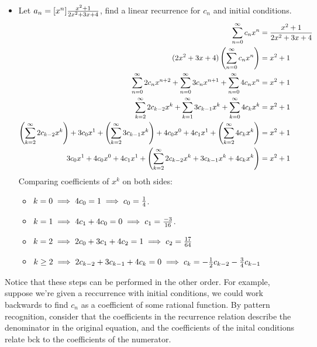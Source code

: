 \documentclass[english, 11pt]{article}
\begin{document}
       \begin{itemize}
         \item Let $a_n = [x^n] \frac{x^2 + 1}{2x^2 + 3x + 4}$, find a linear recurrence for $c_n$ and initial conditions. \\

         \begin{align*}
           \sum_{n = 0}^{\infty} c_nx^n & = \frac{x^2+1}{2x^2 + 3x + 4} \\
           (2x^2 + 3x + 4)\left( \sum_{n=0}^{\infty} c_nx^n \right) & = x^2 + 1 \\
           \sum_{n =0}^{\infty} 2c_nx^{n+2} + \sum_{n = 0}^{\infty} 3c_nx^{n+1} + \sum_{n =0}^{\infty} 4c_nx^n & = x^2 + 1\\
           \sum_{k=2}^{\infty}2c_{k-2}x^k + \sum_{k=1}^{\infty} 3c_{k-1}x^k + \sum_{k=0}^{\infty} 4c_kx^k & = x^2 + 1 \\
          \left( \sum_{k=2}^{\infty}2c_{k-2}x^k\right) + 3c_0x^1 + \left(\sum_{k=2}^{\infty} 3c_{k-1}x^k\right) + 4c_0x^0 + 4c_1x^1 + \left(\sum_{k=2}^{\infty} 4c_kx^k\right) & = x^2 + 1 \\
           3c_0x^1 + 4c_0x^0 + 4c_1x^1 +  \left( \sum_{k=2}^{\infty} 2c_{k-2}x^k + 3c_{k-1}x^k + 4c_kx^k\right) & = x^2 + 1
         \end{align*}
         Comparing coefficients of $x^k$ on both sides:
         \begin{itemize}
           \item $k = 0 \implies 4c_0 = 1 \implies c_0 = \frac{1}{4}$.
           \item $k = 1 \implies 4c_1 + 4c_0 = 0 \implies c_1 = \frac{-3}{16}$.
           \item $k = 2 \implies 2c_0 + 3c_1 + 4c_2 = 1 \implies c_2 = \frac{17}{64}$
           \item $k \geq 2 \implies 2c_{k-2} + 3c_{k-1} + 4c_k = 0 \implies c_k = -\frac{1}{2}c_{k-2} - \frac{3}{4}c_{k-1}$
         \end{itemize}
       \end{itemize}

       Notice that these steps can be performed in the other order. For example, suppose we're given a reccurrence with initial conditions, we could work backwards to find $c_n$ as a coefficient of some rational function. By pattern recognition, consider that the coefficients in the recurrence relation describe the denominator in the original equation, and the coefficients of the inital conditions relate bck to the coefficients of the numerator.
\end{document}
